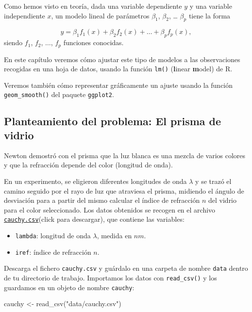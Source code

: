 \documentclass[
  degree=mecinf,
  title=normal,
  toc=normal,
  bib=normal]{mnye}
\newenvironment{Shaded}{\begin{snugshade}}{\end{snugshade}}
\newcommand{\FunctionTok}[1]{\textcolor[rgb]{0.00,0.00,0.00}{#1}}
\newcommand{\NormalTok}[1]{#1}
\newcommand{\OtherTok}[1]{\textcolor[rgb]{0.56,0.35,0.01}{#1}}
\newcommand{\StringTok}[1]{\textcolor[rgb]{0.31,0.60,0.02}{#1}}
\begin{document}
Como hemos visto en teoría, dada una variable dependiente \(y\) y una variable independiente \(x\), un modelo lineal de parámetros \(\beta_1\), \(\beta_2\), \ldots{} \(\beta_p\) tiene la forma

\[
y = \beta_1 f_1(x) + \beta_2 f_2(x) + \dots +\beta_p f_p(x),
\]
siendo \(f_1\), \(f_2\), \(\dots\), \(f_p\) funciones conocidas.

En este capítulo veremos cómo ajustar este tipo de modelos a las observaciones recogidas en una hoja de datos, usando la función \texttt{lm()} (\textbf{l}inear \textbf{m}odel) de \textsf{R}.

Veremos también cómo representar gráficamente un ajuste usando la función \texttt{geom\_smooth()} del paquete \texttt{ggplot2}.

\hypertarget{planteamiento-del-problema-el-prisma-de-vidrio}{%
\subsection{Planteamiento del problema: El prisma de vidrio}\label{planteamiento-del-problema-el-prisma-de-vidrio}}

Newton demostró con el prisma que la luz blanca es una mezcla de varios colores y que la refracción depende del color (longitud de onda).

En un experimento, se eligieron diferentes longitudes de onda \(\lambda\) y se trazó el camino seguido por el rayo de luz que atraviesa el prisma, midiendo el ángulo de desviación para a partir del mismo calcular el índice de refracción \(n\) del vidrio para el color seleccionado. Los datos obtenidos se recogen en el archivo \href{https://drive.google.com/uc?export=download\&id=1fI5_KZA8MAiZVegFmtlQ7Cm4IzlGDQtg}{\texttt{cauchy.csv}}(click para descargar), que contiene las variables:

\begin{itemize}
\item
  \texttt{lambda}: longitud de onda \(\lambda\), medida en \(nm\).
\item
  \texttt{iref}: índice de refracción \(n\).
\end{itemize}

Descarga el fichero \texttt{cauchy.csv} y guárdalo en una carpeta de nombre \texttt{data} dentro de tu directorio de trabajo. Importamos los datos con \texttt{read\_csv()} y los guardamos en un objeto de nombre \texttt{cauchy}:

\begin{Shaded}
\begin{Highlighting}[]
\NormalTok{cauchy }\OtherTok{\textless{}{-}} \FunctionTok{read\_csv}\NormalTok{(}\StringTok{"data/cauchy.csv"}\NormalTok{)}
\end{Highlighting}
\end{Shaded}
\end{document}
